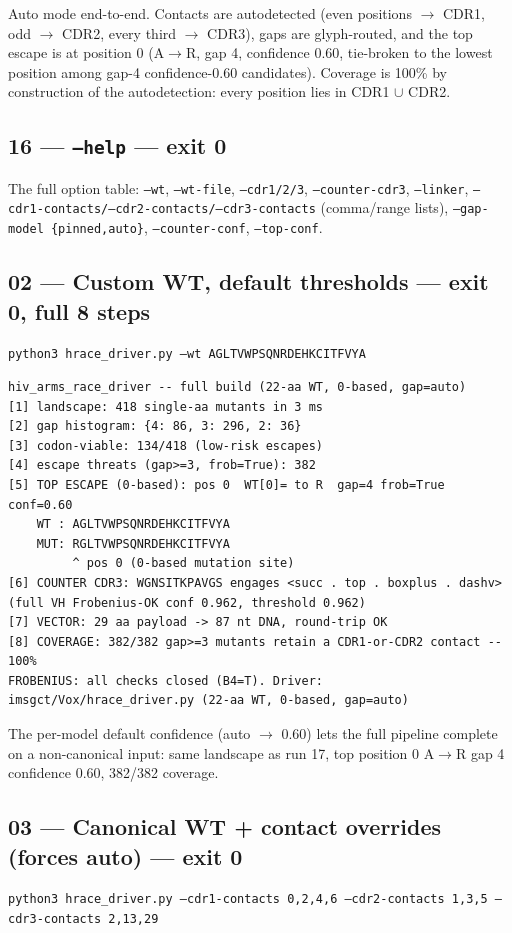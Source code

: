 \documentclass{article}
\begin{document}
Auto mode end-to-end. Contacts are autodetected (even positions \(\to\) CDR1,
odd \(\to\) CDR2, every third \(\to\) CDR3), gaps are glyph-routed, and the top
escape is at position 0 (A\(\to\)R, gap 4, confidence 0.60, tie-broken to the
lowest position among gap-4 confidence-0.60 candidates). Coverage is 100\% by
construction of the autodetection: every position lies in CDR1 \(\cup\) CDR2.

\subsection*{16 --- \texttt{--help} --- exit 0}
The full option table: \texttt{--wt}, \texttt{--wt-file}, \texttt{--cdr1/2/3},
\texttt{--counter-cdr3}, \texttt{--linker},
\texttt{--cdr1-contacts/--cdr2-contacts/--cdr3-contacts} (comma/range lists),
\texttt{--gap-model \{pinned,auto\}}, \texttt{--counter-conf}, \texttt{--top-conf}.

\subsection*{02 --- Custom WT, default thresholds --- exit 0, full 8 steps}
\texttt{python3 hrace\_driver.py --wt AGLTVWPSQNRDEHKCITFVYA}

\begin{lstlisting}
hiv_arms_race_driver -- full build (22-aa WT, 0-based, gap=auto)
[1] landscape: 418 single-aa mutants in 3 ms
[2] gap histogram: {4: 86, 3: 296, 2: 36}
[3] codon-viable: 134/418 (low-risk escapes)
[4] escape threats (gap>=3, frob=True): 382
[5] TOP ESCAPE (0-based): pos 0  WT[0]= to R  gap=4 frob=True conf=0.60
    WT : AGLTVWPSQNRDEHKCITFVYA
    MUT: RGLTVWPSQNRDEHKCITFVYA
         ^ pos 0 (0-based mutation site)
[6] COUNTER CDR3: WGNSITKPAVGS engages <succ . top . boxplus . dashv> (full VH Frobenius-OK conf 0.962, threshold 0.962)
[7] VECTOR: 29 aa payload -> 87 nt DNA, round-trip OK
[8] COVERAGE: 382/382 gap>=3 mutants retain a CDR1-or-CDR2 contact -- 100%
FROBENIUS: all checks closed (B4=T). Driver: imsgct/Vox/hrace_driver.py (22-aa WT, 0-based, gap=auto)
\end{lstlisting}

The per-model default confidence (auto \(\to\) 0.60) lets the full pipeline
complete on a non-canonical input: same landscape as run 17, top position 0
A\(\to\)R gap 4 confidence 0.60, 382/382 coverage.

\subsection*{03 --- Canonical WT + contact overrides (forces auto) --- exit 0}
\texttt{python3 hrace\_driver.py --cdr1-contacts 0,2,4,6 --cdr2-contacts 1,3,5 --cdr3-contacts 2,13,29}
\end{document}
